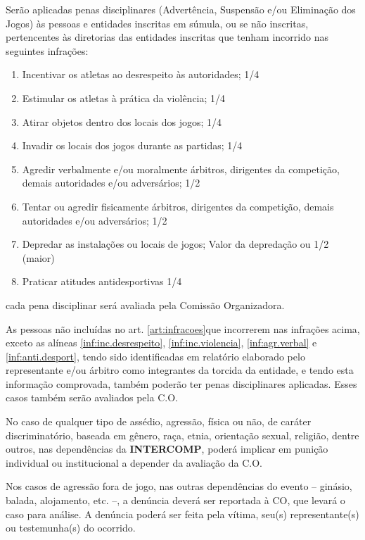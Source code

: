 \begin{article}
	\label{art:infracoes}
	Serão aplicadas penas disciplinares (Advertência, Suspensão e/ou Eliminação dos Jogos) às pessoas e entidades inscritas em súmula, ou se não inscritas, pertencentes às diretorias das entidades inscritas que tenham incorrido nas seguintes infrações:

	\begin{enumerate}[noitemsep]
		\item \label{inf:inc.desrespeito}
			Incentivar os atletas ao desrespeito às autoridades; 1/4
		\item \label{inf:inc.violencia}
			Estimular os atletas à prática da violência; 1/4
		\item Atirar objetos dentro dos locais dos jogos; 1/4
		\item Invadir os locais dos jogos durante as partidas; 1/4
		\item \label{inf:agr.verbal}
			Agredir verbalmente e/ou moralmente árbitros, dirigentes da competição, demais autoridades e/ou adversários; 1/2
		\item Tentar ou agredir fisicamente árbitros, dirigentes da competição, demais autoridades e/ou adversários; 1/2
		\item Depredar as instalações ou locais de jogos; Valor da depredação ou 1/2 (maior)
		\item \label{inf:anti.desport}
			Praticar atitudes antidesportivas 1/4
	\end{enumerate}

	\begin{xparagraph}
		cada pena disciplinar será avaliada pela Comissão Organizadora.
	\end{xparagraph}
\end{article}

\begin{article}
	As pessoas não incluídas no art. \ref{art:infracoes}\ulo que incorrerem nas infrações acima, exceto as alíneas \ref{inf:inc.desrespeito}, \ref{inf:inc.violencia}, \ref{inf:agr.verbal} e \ref{inf:anti.desport}, tendo sido identificadas em relatório elaborado pelo representante e/ou árbitro como integrantes da torcida da entidade, e tendo esta informação comprovada, também poderão ter penas disciplinares aplicadas. Esses casos também serão avaliados pela C.O.
\end{article}

\begin{article}
	No caso de qualquer tipo de assédio, agressão, física ou não, de caráter discriminatório, baseada em gênero, raça, etnia, orientação sexual, religião, dentre outros, nas dependências da \textbf{INTERCOMP}, poderá implicar em punição individual ou institucional a depender da avaliação da C.O.

	\begin{xparagraph}
		Nos casos de agressão fora de jogo, nas outras dependências do evento -- ginásio, balada, alojamento, etc. --, a denúncia deverá ser reportada à CO, que levará o caso para análise. A denúncia poderá ser feita pela vítima, seu(s) representante(s) ou testemunha(s) do ocorrido.
	\end{xparagraph}
\end{article}
